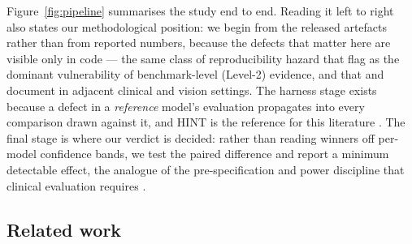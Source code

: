 \documentclass[a4paper,fleqn]{cas-sc}
\begin{document}
Figure~\ref{fig:pipeline} summarises the study end to end. Reading it left to right also states our
methodological position: we begin from the released artefacts rather than from reported numbers,
because the defects that matter here are visible only in code --- the same class of reproducibility
hazard that \citet{yang2026large} flag as the dominant vulnerability of benchmark-level (Level-2)
evidence, and that \citet{degrave2021ai} and \citet{geirhos2020shortcut} document in adjacent
clinical and vision settings. The harness stage exists because a defect in a \emph{reference}
model's evaluation propagates into every comparison drawn against it, and HINT is the reference for
this literature \citep{zhang2025mexactp,chen2024uq,wang2023spot}. The final stage is where our
verdict is decided: rather than reading winners off per-model confidence bands, we test the paired
difference and report a minimum detectable effect, the analogue of the pre-specification and
power discipline that clinical evaluation requires \citep{ylescupidez2023standardized,mentz2021clinical}.
\subsection{Related work}
\end{document}
